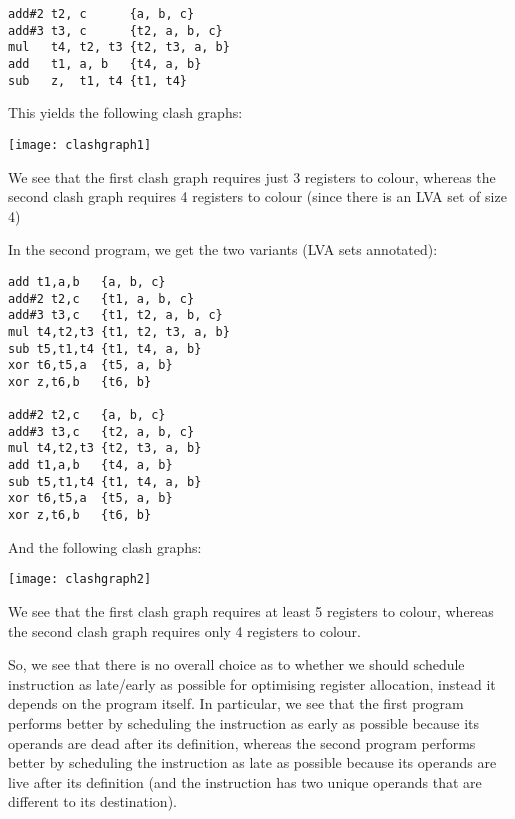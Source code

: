 \begin{enumerate}[label=(\alph*)]
\begin{verbatim}
add#2 t2, c      {a, b, c}
add#3 t3, c      {t2, a, b, c}
mul   t4, t2, t3 {t2, t3, a, b}
add   t1, a, b   {t4, a, b}
sub   z,  t1, t4 {t1, t4}
\end{verbatim}

This yields the following clash graphs:

\texttt{[image: clashgraph1]}

We see that the first clash graph requires just 3 registers to colour, whereas the second clash graph requires 4 registers to colour (since there is an LVA set of size 4)

In the second program, we get the two variants (LVA sets annotated):

\begin{verbatim}
add t1,a,b   {a, b, c}
add#2 t2,c   {t1, a, b, c}
add#3 t3,c   {t1, t2, a, b, c}
mul t4,t2,t3 {t1, t2, t3, a, b}
sub t5,t1,t4 {t1, t4, a, b}
xor t6,t5,a  {t5, a, b}
xor z,t6,b   {t6, b}
    
add#2 t2,c   {a, b, c}
add#3 t3,c   {t2, a, b, c}
mul t4,t2,t3 {t2, t3, a, b}
add t1,a,b   {t4, a, b}
sub t5,t1,t4 {t1, t4, a, b}
xor t6,t5,a  {t5, a, b}
xor z,t6,b   {t6, b}
\end{verbatim}

And the following clash graphs:

\texttt{[image: clashgraph2]}
 
We see that the first clash graph requires at least 5 registers to colour, whereas the second clash graph requires only 4 registers to colour.

So, we see that there is no overall choice as to whether we should schedule instruction as late/early as possible for optimising register allocation, instead it depends on the program itself. In particular, we see that the first program performs better by scheduling the instruction as early as possible because its operands are dead after its definition, whereas the second program performs better by scheduling the instruction as late as possible because its operands are live after its definition (and the instruction has two unique operands that are different to its destination).



        
    \end{enumerate}

